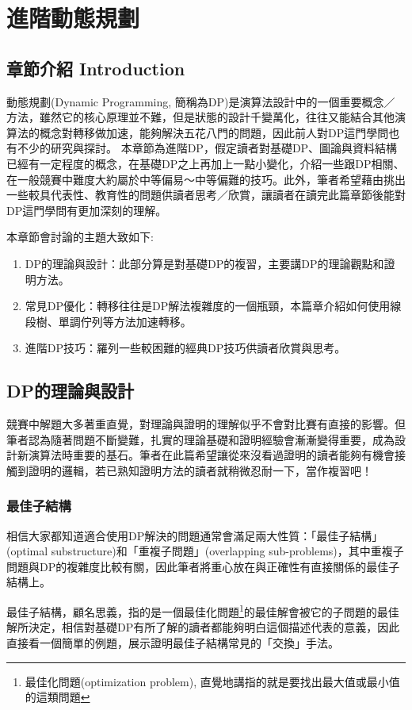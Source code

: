 %
\chapter{進階動態規劃}
\label{sec:dp2:intro}

\section{章節介紹 Introduction}
動態規劃(Dynamic Programming, 簡稱為DP)是演算法設計中的一個重要概念／方法，雖然它的核心原理並不難，但是狀態的設計千變萬化，往往又能結合其他演算法的概念對轉移做加速，能夠解決五花八門的問題，因此前人對DP這門學問也有不少的研究與探討。
本章節為進階DP，假定讀者對基礎DP、圖論與資料結構已經有一定程度的概念，在基礎DP之上再加上一點小變化，介紹一些跟DP相關、在一般競賽中難度大約屬於中等偏易～中等偏難的技巧。此外，筆者希望藉由挑出一些較具代表性、教育性的問題供讀者思考／欣賞，讓讀者在讀完此篇章節後能對DP這門學問有更加深刻的理解。

本章節會討論的主題大致如下:
\begin{enumerate}
\item DP的理論與設計：此部分算是對基礎DP的複習，主要講DP的理論觀點和證明方法。
\item 常見DP優化：轉移往往是DP解法複雜度的一個瓶頸，本篇章介紹如何使用線段樹、單調佇列等方法加速轉移。
\item 進階DP技巧：羅列一些較困難的經典DP技巧供讀者欣賞與思考。
\end{enumerate}

\section{DP的理論與設計}
\label{sec:dp2:theory}
競賽中解題大多著重直覺，對理論與證明的理解似乎不會對比賽有直接的影響。但筆者認為隨著問題不斷變難，扎實的理論基礎和證明經驗會漸漸變得重要，成為設計新演算法時重要的基石。筆者在此篇希望讓從來沒看過證明的讀者能夠有機會接觸到證明的邏輯，若已熟知證明方法的讀者就稍微忍耐一下，當作複習吧！

\subsection{最佳子結構}
\label{sec:dp2:theory:correctness}
相信大家都知道適合使用DP解決的問題通常會滿足兩大性質：「最佳子結構」(optimal substructure)和「重複子問題」(overlapping sub-problems)，其中重複子問題與DP的複雜度比較有關，因此筆者將重心放在與正確性有直接關係的最佳子結構上。

最佳子結構，顧名思義，指的是一個最佳化問題\footnote{最佳化問題(optimization problem), 直覺地講指的就是要找出最大值或最小值的這類問題}的最佳解會被它的子問題的最佳解所決定，相信對基礎DP有所了解的讀者都能夠明白這個描述代表的意義，因此直接看一個簡單的例題，展示證明最佳子結構常見的「交換」手法。

